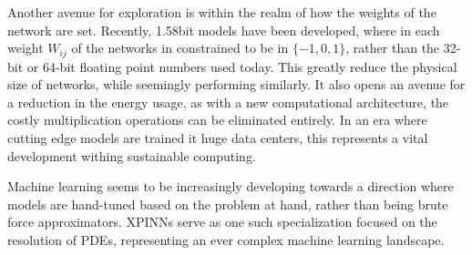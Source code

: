 Another avenue for exploration is within the realm of how the weights of the network are set.
Recently, 1.58bit models \cite{ma2024era} have been developed, where in each weight $W_{ij}$ of the networks in constrained to be in $\{-1, 0, 1\}$, rather than the 32-bit or 64-bit floating point numbers used today.
This greatly reduce the physical size of networks, while seemingly performing similarly.
It also opens an avenue for a reduction in the energy usage, as with a new computational architecture, the costly multiplication operations can be eliminated entirely.
In an era where cutting edge models are trained it huge data centers, this represents a vital development withing sustainable computing.

Machine learning seems to be increasingly developing towards a direction where models are hand-tuned based on the problem at hand, rather than being brute force approximators.
XPINNs serve as one such specialization focused on the resolution of PDEs, representing an ever complex machine learning landscape.




